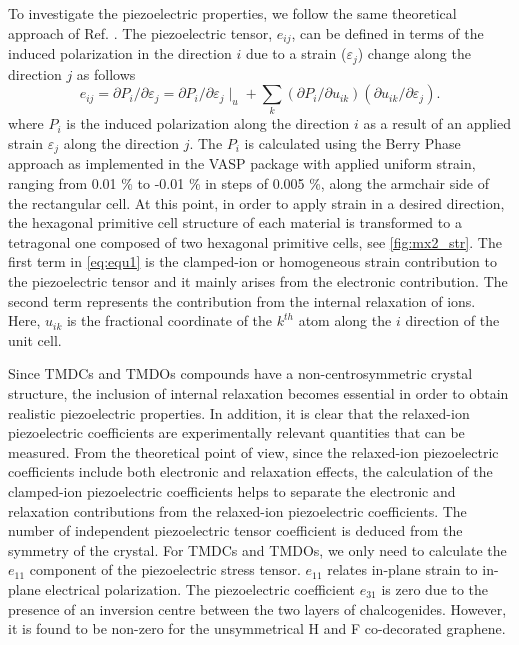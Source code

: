 To investigate the piezoelectric properties, we follow the same theoretical approach of Ref. \cite{Duerloo2012}. The piezoelectric tensor\cite{baroni,PhysRevB.72.035105}, $e_{ij}$, can be defined  in terms of the induced polarization in the  direction $i$ due to a strain ($\varepsilon_{j}$) change along the direction $j$ as follows
\begin{equation}
e_{ij}=\partial P_{i}/\partial\varepsilon_{j}=\partial P_{i}/\partial\varepsilon_{j}\mid_u+\sum_k (\partial P_{i}/\partial u_{ik})(\partial u_{ik}/\partial\varepsilon_{j}). \label{eq:equ1}
\end{equation}
where $P_i$ is the induced polarization along the direction $i$ as a result of an applied strain $\varepsilon_{j}$ along the direction $j$. 
The $P_i$ is calculated using the Berry Phase approach\cite{vanderbilt2000} as implemented in the VASP package with applied uniform strain, ranging from 0.01 \% to -0.01 \% in steps of 0.005 \%, along the armchair side of the rectangular cell. At this point, in order to apply strain in a desired direction, the hexagonal primitive cell structure of each material is transformed to a tetragonal one composed of two hexagonal primitive cells\cite{Duerloo2012}, see \autoref{fig:mx2_str}. The first term in \autoref{eq:equ1} is the clamped-ion or homogeneous strain contribution to the piezoelectric tensor and it mainly arises from the electronic contribution. The second term represents the contribution from the internal relaxation of ions. Here, $u_{ik}$ is the fractional coordinate of the $k^{th}$ atom along the $i$ direction of the unit cell. 

Since TMDCs and TMDOs compounds have a non-centrosymmetric crystal structure, the inclusion of internal relaxation becomes essential in order to obtain realistic piezoelectric properties. In addition, it is clear that the relaxed-ion piezoelectric coefficients are experimentally relevant quantities that can be measured. From the theoretical point of view, since the relaxed-ion piezoelectric coefficients include both electronic and relaxation effects, the calculation of the clamped-ion piezoelectric coefficients helps to separate the electronic and relaxation contributions from the relaxed-ion piezoelectric coefficients. The number of independent piezoelectric tensor coefficient is deduced from the symmetry of the crystal. For TMDCs and TMDOs, we only need to calculate the $e_{11}$ component of the piezoelectric stress tensor. $e_{11}$ relates in-plane strain to in-plane electrical polarization. The piezoelectric coefficient $e_{31}$ is zero due to the presence of an inversion centre between the two layers of chalcogenides. However, it is found to be non-zero for the unsymmetrical H and F co-decorated graphene\cite{Ong2013,KIM201462}. 

